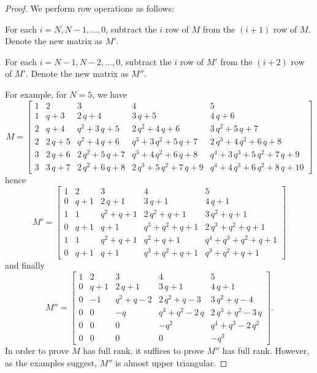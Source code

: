 \begin{proof}
  We perform row operations as follows:
  \begin{itemize}
    \ii For each $i=N,N-1,\dots,0$, subtract the $i$ row of $M$
    from the $(i+1)$ row of $M$.
    Denote the new matrix as $M'$.

    \ii For each $i=N-1,N-2,\dots,0$, subtract the $i$ row of $M'$
    from the $(i+2)$ row of $M'$.
    Denote the new matrix as $M''$.
  \end{itemize}
  For example, for $N = 5$, we have
  \[
    M =
    \begin{bmatrix}
    1 & 2 & 3 & 4 & 5 \\
    1 & q + 3 & 2 \, q + 4 & 3 \, q + 5 & 4 \, q + 6 \\
    2 & q + 4 & q^{2} + 3 \, q + 5 & 2 \, q^{2} + 4 \, q + 6 & 3 \, q^{2} + 5 \, q + 7 \\
    2 & 2 \, q + 5 & q^{2} + 4 \, q + 6 & q^{3} + 3 \, q^{2} + 5 \, q + 7 & 2 \, q^{3} + 4 \, q^{2} + 6 \, q + 8 \\
    3 & 2 \, q + 6 & 2 \, q^{2} + 5 \, q + 7 & q^{3} + 4 \, q^{2} + 6 \, q + 8 & q^{4} + 3 \, q^{3} + 5 \, q^{2} + 7 \, q + 9 \\
    3 & 3 \, q + 7 & 2 \, q^{2} + 6 \, q + 8 & 2 \, q^{3} + 5 \, q^{2} + 7 \, q + 9 & q^{4} + 4 \, q^{3} + 6 \, q^{2} + 8 \, q + 10
    \end{bmatrix}
  \]
  hence
  \[ M'=
    \begin{bmatrix}
    1 & 2 & 3 & 4 & 5 \\
    0 & q + 1 & 2 \, q + 1 & 3 \, q + 1 & 4 \, q + 1 \\
    1 & 1 & q^{2} + q + 1 & 2 \, q^{2} + q + 1 & 3 \, q^{2} + q + 1 \\
    0 & q + 1 & q + 1 & q^{3} + q^{2} + q + 1 & 2 \, q^{3} + q^{2} + q + 1 \\
    1 & 1 & q^{2} + q + 1 & q^{2} + q + 1 & q^{4} + q^{3} + q^{2} + q + 1 \\
    0 & q + 1 & q + 1 & q^{3} + q^{2} + q + 1 & q^{3} + q^{2} + q + 1
    \end{bmatrix}
  \]
  and finally
  \[ M'' =
    \begin{bmatrix}
    1 & 2 & 3 & 4 & 5 \\
    0 & q + 1 & 2 \, q + 1 & 3 \, q + 1 & 4 \, q + 1 \\
    0 & -1 & q^{2} + q - 2 & 2 \, q^{2} + q - 3 & 3 \, q^{2} + q - 4 \\
    0 & 0 & -q & q^{3} + q^{2} - 2 \, q & 2 \, q^{3} + q^{2} - 3 \, q \\
    0 & 0 & 0 & -q^{2} & q^{4} + q^{3} - 2 \, q^{2} \\
    0 & 0 & 0 & 0 & -q^{3}
    \end{bmatrix}.
  \]
  In order to prove $M$ has full rank, it suffices to prove $M''$ has full rank.
  However, as the examples suggest, $M''$ is almost upper triangular.


\end{proof}
